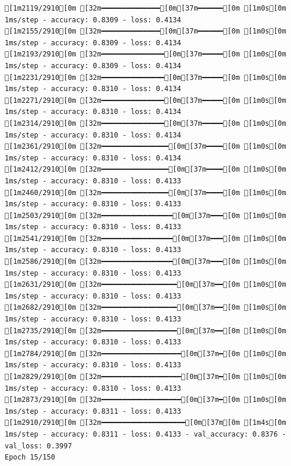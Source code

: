 \documentclass[
  letterpaper,
  DIV=11,
  numbers=noendperiod]{scrartcl}
\begin{document}
\begin{verbatim}
[1m2119/2910[0m [32m━━━━━━━━━━━━━━[0m[37m━━━━━━[0m [1m0s[0m 1ms/step - accuracy: 0.8309 - loss: 0.4134
[1m2155/2910[0m [32m━━━━━━━━━━━━━━[0m[37m━━━━━━[0m [1m0s[0m 1ms/step - accuracy: 0.8309 - loss: 0.4134
[1m2193/2910[0m [32m━━━━━━━━━━━━━━━[0m[37m━━━━━[0m [1m0s[0m 1ms/step - accuracy: 0.8309 - loss: 0.4134
[1m2231/2910[0m [32m━━━━━━━━━━━━━━━[0m[37m━━━━━[0m [1m0s[0m 1ms/step - accuracy: 0.8310 - loss: 0.4134
[1m2271/2910[0m [32m━━━━━━━━━━━━━━━[0m[37m━━━━━[0m [1m0s[0m 1ms/step - accuracy: 0.8310 - loss: 0.4134
[1m2314/2910[0m [32m━━━━━━━━━━━━━━━[0m[37m━━━━━[0m [1m0s[0m 1ms/step - accuracy: 0.8310 - loss: 0.4134
[1m2361/2910[0m [32m━━━━━━━━━━━━━━━━[0m[37m━━━━[0m [1m0s[0m 1ms/step - accuracy: 0.8310 - loss: 0.4134
[1m2412/2910[0m [32m━━━━━━━━━━━━━━━━[0m[37m━━━━[0m [1m0s[0m 1ms/step - accuracy: 0.8310 - loss: 0.4133
[1m2460/2910[0m [32m━━━━━━━━━━━━━━━━[0m[37m━━━━[0m [1m0s[0m 1ms/step - accuracy: 0.8310 - loss: 0.4133
[1m2503/2910[0m [32m━━━━━━━━━━━━━━━━━[0m[37m━━━[0m [1m0s[0m 1ms/step - accuracy: 0.8310 - loss: 0.4133
[1m2541/2910[0m [32m━━━━━━━━━━━━━━━━━[0m[37m━━━[0m [1m0s[0m 1ms/step - accuracy: 0.8310 - loss: 0.4133
[1m2586/2910[0m [32m━━━━━━━━━━━━━━━━━[0m[37m━━━[0m [1m0s[0m 1ms/step - accuracy: 0.8310 - loss: 0.4133
[1m2631/2910[0m [32m━━━━━━━━━━━━━━━━━━[0m[37m━━[0m [1m0s[0m 1ms/step - accuracy: 0.8310 - loss: 0.4133
[1m2682/2910[0m [32m━━━━━━━━━━━━━━━━━━[0m[37m━━[0m [1m0s[0m 1ms/step - accuracy: 0.8310 - loss: 0.4133
[1m2735/2910[0m [32m━━━━━━━━━━━━━━━━━━[0m[37m━━[0m [1m0s[0m 1ms/step - accuracy: 0.8310 - loss: 0.4133
[1m2784/2910[0m [32m━━━━━━━━━━━━━━━━━━━[0m[37m━[0m [1m0s[0m 1ms/step - accuracy: 0.8310 - loss: 0.4133
[1m2829/2910[0m [32m━━━━━━━━━━━━━━━━━━━[0m[37m━[0m [1m0s[0m 1ms/step - accuracy: 0.8310 - loss: 0.4133
[1m2873/2910[0m [32m━━━━━━━━━━━━━━━━━━━[0m[37m━[0m [1m0s[0m 1ms/step - accuracy: 0.8311 - loss: 0.4133
[1m2910/2910[0m [32m━━━━━━━━━━━━━━━━━━━━[0m[37m[0m [1m4s[0m 1ms/step - accuracy: 0.8311 - loss: 0.4133 - val_accuracy: 0.8376 - val_loss: 0.3997
Epoch 15/150


\end{verbatim}
\end{document}
